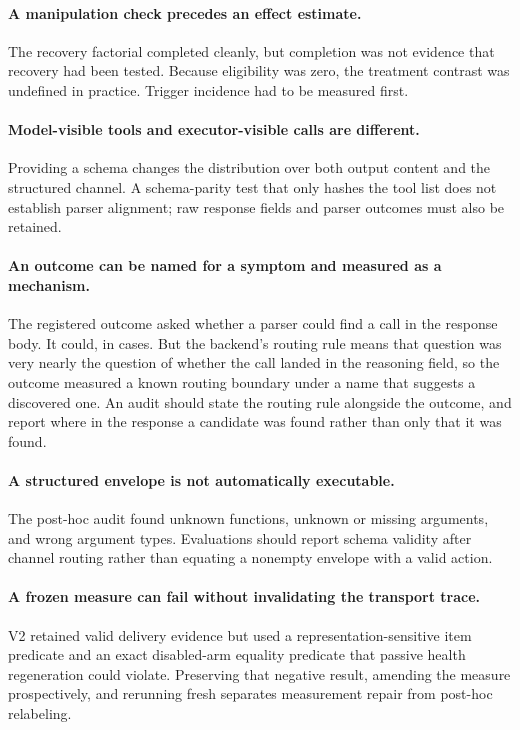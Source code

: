 \documentclass[10pt]{article}
\begin{document}
\paragraph{A manipulation check precedes an effect estimate.}
The recovery factorial completed cleanly, but completion was not evidence that
recovery had been tested. Because eligibility was zero, the treatment contrast
was undefined in practice. Trigger incidence had to be measured first.

\paragraph{Model-visible tools and executor-visible calls are different.}
Providing a schema changes the distribution over both output content and the
structured channel. A schema-parity test that only hashes the tool list does not
establish parser alignment; raw response fields and parser outcomes must also be
retained.

\paragraph{An outcome can be named for a symptom and measured as a mechanism.}
The registered outcome asked whether a parser could find a call in the response
body. It could, in \SpanRecoveredCalls{} cases. But the backend's routing rule
means that question was very nearly the question of whether the call landed in
the reasoning field, so the outcome measured a known routing boundary under a
name that suggests a discovered one. An audit should state the routing rule
alongside the outcome, and report where in the response a candidate was found
rather than only that it was found.

\paragraph{A structured envelope is not automatically executable.}
The post-hoc audit found unknown functions, unknown or missing arguments, and
wrong argument types. Evaluations should report schema validity after channel
routing rather than equating a nonempty envelope with a valid action.

\paragraph{A frozen measure can fail without invalidating the transport trace.}
V2 retained valid delivery evidence but used a representation-sensitive item
predicate and an exact disabled-arm equality predicate that passive health
regeneration could violate. Preserving that negative result, amending the
measure prospectively, and rerunning fresh separates measurement repair from
post-hoc relabeling.
\end{document}
